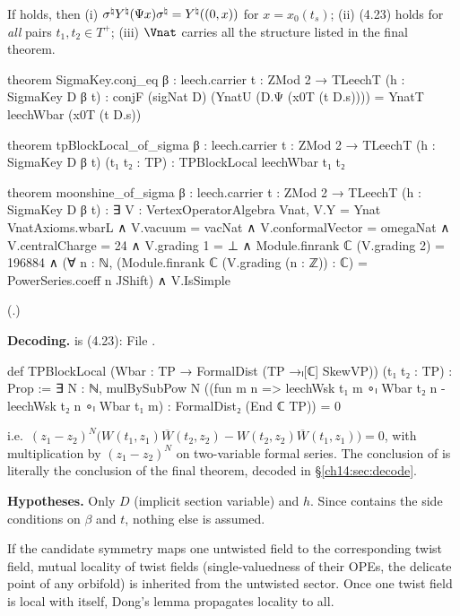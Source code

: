 \begin{theorem}\label{ch14:thm:tpblock}
If  holds, then (i) $\sigma^{\natural} Y^\natural(\Psi x)\sigma^{\natural}=Y^\natural((0,x))$ for
$x=x_0(t_s)$; (ii) (4.23) holds for \emph{all} pairs $t_1,t_2\in T^+$; (iii) $\Vnat$ carries all the
structure listed in the final theorem.
\end{theorem}
\begin{leancode}
theorem SigmaKey.conj_eq {β : leech.carrier} {t : ZMod 2 → TLeechT} (h : SigmaKey D β t) :
    conjF (sigNat D) (YnatU (D.Ψ (x0T (t D.s)))) = YnatT leechWbar (x0T (t D.s))

theorem tpBlockLocal_of_sigma {β : leech.carrier} {t : ZMod 2 → TLeechT} (h : SigmaKey D β t)
    (t₁ t₂ : TP) : TPBlockLocal leechWbar t₁ t₂

theorem moonshine_of_sigma {β : leech.carrier} {t : ZMod 2 → TLeechT} (h : SigmaKey D β t) :
    ∃ V : VertexOperatorAlgebra Vnat,
      V.Y = Ynat VnatAxioms.wbarL ∧ V.vacuum = vacNat ∧ V.conformalVector = omegaNat ∧
      V.centralCharge = 24 ∧
      V.grading 1 = ⊥ ∧
      Module.finrank ℂ (V.grading 2) = 196884 ∧
      (∀ n : ℕ, (Module.finrank ℂ (V.grading (n : ℤ)) : ℂ) = PowerSeries.coeff n JShift) ∧
      V.IsSimple
\end{leancode}
(.)

\begin{dictionary}
\textbf{Decoding.}   is (4.23):
\noindent File .
\begin{leancode}
def TPBlockLocal (Wbar : TP → FormalDist (TP →ₗ[ℂ] SkewVP)) (t₁ t₂ : TP) : Prop :=
  ∃ N : ℕ, mulBySubPow N
    ((fun m n => leechWsk t₁ m ∘ₗ Wbar t₂ n - leechWsk t₂ n ∘ₗ Wbar t₁ m) :
      FormalDist₂ (End ℂ TP)) = 0
\end{leancode}
i.e.\ $(z_1-z_2)^N\bigl(W(t_1,z_1)\overline W(t_2,z_2)-W(t_2,z_2)\overline W(t_1,z_1)\bigr)=0$, with
 multiplication by $(z_1-z_2)^N$ on two-variable formal series.  The conclusion of
 is literally the conclusion of the final theorem, decoded in
\S\ref{ch14:sec:decode}.

\textbf{Hypotheses.}  Only $D$ (implicit section variable) and $h$.  Since  contains the side
conditions on $\beta$ and $t$, nothing else is assumed.
\end{dictionary}
\begin{physics}
If the candidate symmetry maps one untwisted field to the corresponding twist field, mutual locality of twist fields (single-valuedness of their OPEs, the delicate point of any orbifold) is inherited from the untwisted sector. Once one twist field is local with itself, Dong's lemma propagates locality to all.
\end{physics}


